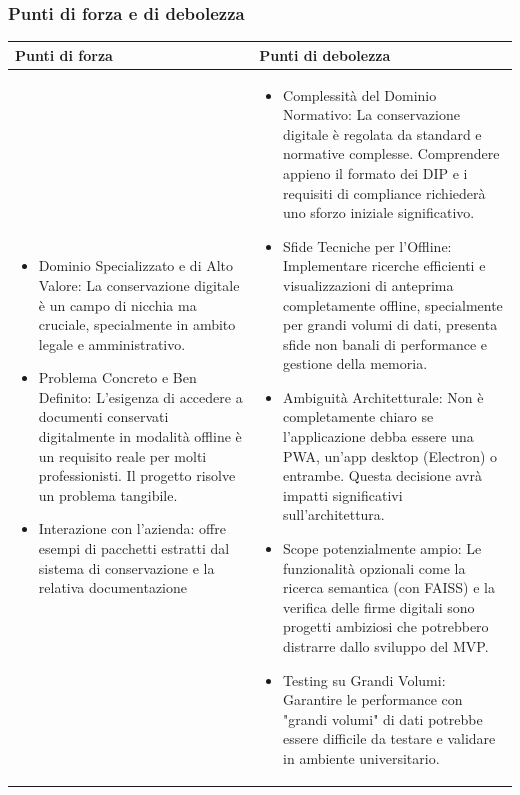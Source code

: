 \documentclass[a4paper,11pt]{article}
\begin{document}
\subsubsection{Punti di forza e di debolezza}
{\footnotesize
\begin{tabularx}{\textwidth}{|X|X|}
\hline
\rowcolor{lightgray!40} %
\textbf{Punti di forza} & \textbf{Punti di debolezza} \\
\hline
\begin{itemize}
\item Dominio Specializzato e di Alto Valore: La conservazione digitale è un campo di nicchia ma cruciale, specialmente in ambito legale e amministrativo.
\item Problema Concreto e Ben Definito: L'esigenza di accedere a documenti conservati digitalmente in modalità offline è un requisito reale per molti professionisti. Il progetto risolve un problema tangibile.
\item Interazione con l’azienda: offre esempi di pacchetti estratti dal sistema di conservazione e la relativa documentazione
\end{itemize}
 & \begin{itemize}
\item Complessità del Dominio Normativo: La conservazione digitale è regolata da standard e normative complesse. Comprendere appieno il formato dei DIP e i requisiti di compliance richiederà uno sforzo iniziale significativo.
\item Sfide Tecniche per l'Offline: Implementare ricerche efficienti e visualizzazioni di anteprima completamente offline, specialmente per grandi volumi di dati, presenta sfide non banali di performance e gestione della memoria.

\item Ambiguità Architetturale: Non è completamente chiaro se l'applicazione debba essere una PWA, un'app desktop (Electron) o entrambe. Questa decisione avrà impatti significativi sull'architettura.
\item Scope potenzialmente ampio: Le funzionalità opzionali come la ricerca semantica (con FAISS) e la verifica delle firme digitali sono progetti ambiziosi che potrebbero distrarre dallo sviluppo del MVP.
\item Testing su Grandi Volumi: Garantire le performance con "grandi volumi" di dati potrebbe essere difficile da testare e validare in ambiente universitario.
\end{itemize} \\
\hline
\end{tabularx}
}
\end{document}
